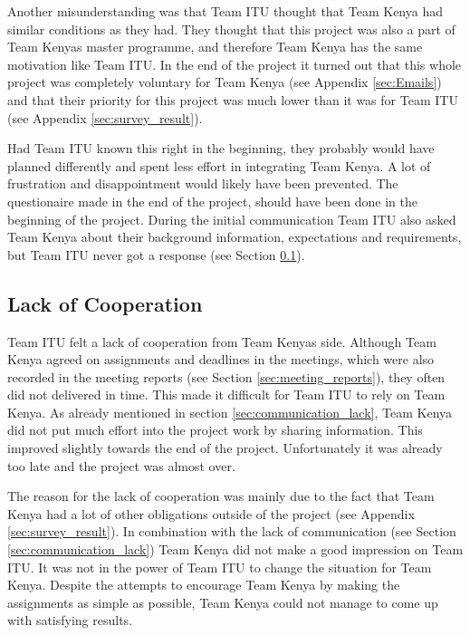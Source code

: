 Another misunderstanding was that Team ITU thought that Team Kenya had similar conditions as they had. They thought that this project was also a part of Team Kenyas master programme, and therefore Team Kenya has the same motivation like Team ITU.
In the end of the project it turned out that this whole project was completely voluntary for Team Kenya (see Appendix \ref{sec:Emails}) and that their priority for this project was much lower than it was for Team ITU  (see Appendix \ref{sec:survey_result}).

Had Team ITU known this right in the beginning, they probably would have planned differently and spent less effort in integrating Team Kenya. A lot of frustration and disappointment would likely have been prevented. The questionaire made in the end of the project, should have been done in the beginning of the project. During the initial communication Team ITU also asked Team Kenya about their background information, expectations and requirements, but Team ITU never got a response (see Section \ref{sec:cooperation_lack}).


\subsection{Lack of Cooperation}
\label{sec:cooperation_lack}
Team ITU felt a lack of cooperation from Team Kenyas side. Although Team Kenya agreed on assignments and deadlines in the meetings, which were also recorded in the meeting reports (see Section \ref{sec:meeting_reports}), they often did not delivered in time. This made it difficult for Team ITU to rely on Team Kenya. As already mentioned in section \ref{sec:communication_lack}, Team Kenya did not put much effort into the project work by sharing information. This improved slightly towards the end of the project. Unfortunately it was already too late and the project was almost over.

The reason for the lack of cooperation was mainly due to the fact that Team Kenya had a lot of other obligations outside of the project (see Appendix \ref{sec:survey_result}). In combination with the lack of communication (see Section \ref{sec:communication_lack}) Team Kenya did not make a good impression on Team ITU. It was not in the power of Team ITU to change the situation for Team Kenya. Despite the attempts to encourage Team Kenya by making the assignments as simple as possible, Team Kenya could not manage to come up with satisfying results.

